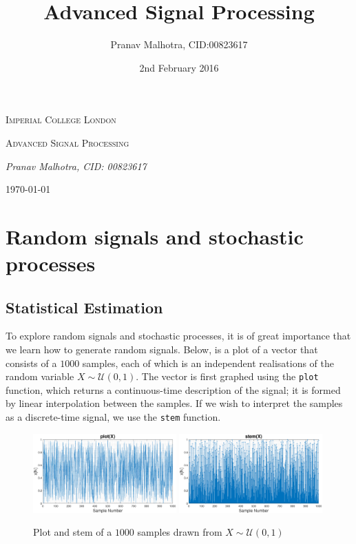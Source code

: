 \documentclass{article}
\title{Advanced Signal Processing}
\author{
  Pranav Malhotra, CID:\num{00823617}
}
\date{2nd February 2016}
\begin{document}
\begin{titlepage}
	\centering
	{\scshape\LARGE Imperial College London \par}
	\vspace{2cm}
	{\scshape\Large Advanced Signal Processing \par}
	\vspace{2.5cm}
	{\Large\itshape Pranav Malhotra, CID: 00823617 \par}
	\vfill
	{\large \today\par}
\end{titlepage}

\tableofcontents
\newpage
\section{Random signals and stochastic processes}
\subsection{Statistical Estimation}
To explore random signals and stochastic processes, it is of great importance that we learn how to generate random signals. Below, is a plot of a vector that consists of a $1000$ samples, each of which is an independent realisations of the random variable $X\sim \mathcal{U}(0,1)$. The vector is first graphed using the {\tt plot} function, which returns a continuous-time description of the signal; it is formed by linear interpolation between the samples. If we wish to interpret the samples as a discrete-time signal, we use the {\tt stem} function.



\begin{figure}[H]
\includegraphics[width=0.49\textwidth]{plot_x}
\includegraphics[width=0.49\textwidth]{stem_x}
\caption{Plot and stem of a $1000$ samples drawn from $X\sim \mathcal{U}(0,1)$}
\end{figure}
\end{document}
